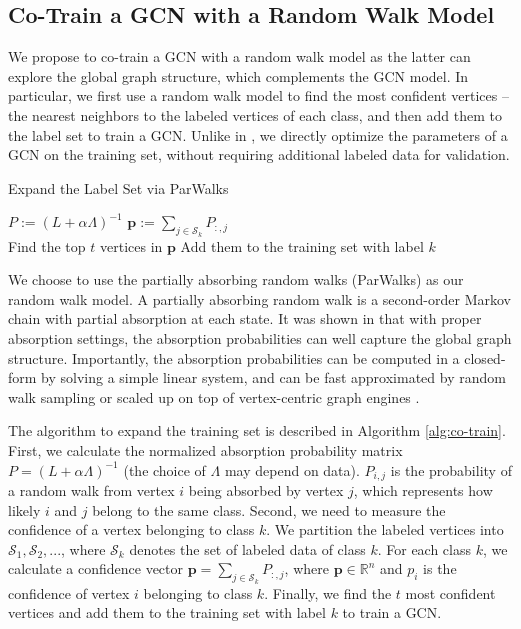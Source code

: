\documentclass[letterpaper]{article} \usepackage{aaai18}  \usepackage{times}  \usepackage{helvet}  \usepackage{courier}  \usepackage{url}  \usepackage{graphicx}  \usepackage{algorithm}
\begin{document}
\subsection{Co-Train a GCN with a Random Walk Model}

We propose to co-train a GCN with a random walk model as the latter can explore the global graph structure, which complements the GCN model. In particular, we first use a random walk model to find the most confident vertices -- the nearest neighbors to the labeled vertices of each class, and then add them to the label set to train a GCN. Unlike in \cite{kipf2016semi}, we directly optimize the parameters of a GCN on the training set, without requiring additional labeled data for validation.

\begin{algorithm}
    \caption{Expand the Label Set via ParWalks}\label{alg:co-train}
    \label{parwalk}
    \begin{algorithmic}[1]
    \STATE $P:=(L+\alpha \Lambda)^{-1}$
    \STATE $\bm {p}:=\sum\limits_{j \in \mathcal{S}_k}P_{:,j}$  \\
     \STATE Find the top $t$ vertices in $\bm p$ \STATE Add them to the training set with label $k$
\ENDFOR
    \end{algorithmic}
\end{algorithm}




We choose to use the partially absorbing random walks (ParWalks) \cite{Wu12parw} as our random walk model. A partially absorbing random walk is a second-order Markov chain with partial absorption at each state. It was shown in \cite{nips13_harmonic} that with proper absorption settings, the absorption probabilities can well capture the global graph structure. Importantly, the absorption probabilities can be computed in a closed-form by solving a simple linear system, and can be fast approximated by random walk sampling or scaled up on top of vertex-centric graph engines \cite{guo2017graph}.






The algorithm to expand the training set is described in Algorithm \ref{alg:co-train}.
First, we calculate the normalized absorption probability matrix $P=(L+\alpha \Lambda)^{-1}$ (the choice of $\Lambda$ may depend on data). $P_{i,j}$ is the probability of a random walk from vertex $i$ being absorbed by vertex $j$, which represents how likely $i$ and $j$ belong to the same class. Second, we need to measure the confidence of a vertex belonging to class $k$. We partition the labeled vertices into ${\mathcal{S}_1, \mathcal{S}_2, ...}$, where $\mathcal{S}_k$ denotes the set of labeled data of class $k$. For each class $k$, we calculate a confidence vector $\mathbf{p} = \sum\limits_{j \in \mathcal{S}_k}P_{:,j}$,
where $\mathbf{p} \in \mathbb{R}^n$ and $p_{i}$ is the confidence of vertex $i$ belonging to class $k$. Finally, we find the $t$ most confident vertices and add them to the training set with label $k$ to train a GCN.
\end{document}
